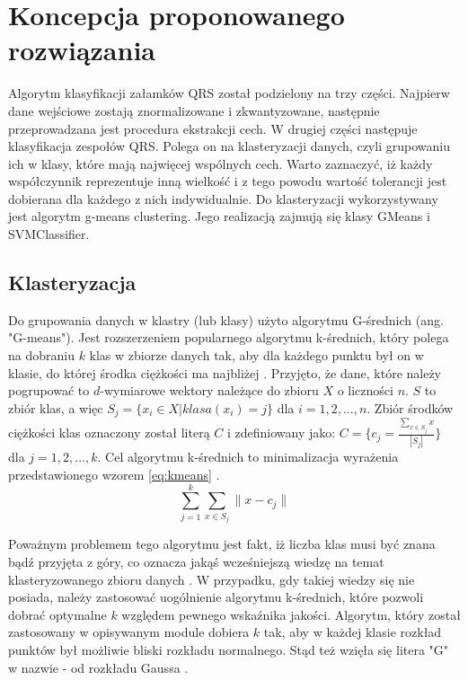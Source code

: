 \section{Koncepcja proponowanego rozwiązania}

\qquad Algorytm klasyfikacji załamków QRS został podzielony na trzy części. Najpierw dane wejściowe zostają znormalizowane i zkwantyzowane, następnie przeprowadzana jest procedura ekstrakcji cech. W drugiej części następuje klasyfikacja zespołów QRS. Polega on na  klasteryzacji danych, czyli grupowaniu ich w klasy, które mają najwięcej wspólnych cech. Warto zaznaczyć, iż każdy współczynnik reprezentuje inną wielkość i z tego powodu wartość tolerancji jest dobierana dla każdego z nich indywidualnie. Do klasteryzacji wykorzystywany jest algorytm g-means clustering. Jego realizacją zajmują się klasy GMeans i SVMClassifier.

\subsection{Klasteryzacja}

\qquad Do grupowania danych w klastry (lub klasy) użyto algorytmu G-średnich (ang. "G-means"). Jest rozszerzeniem popularnego algorytmu k-średnich, który polega na dobraniu $k$ klas w zbiorze danych tak, aby dla każdego punktu był on w klasie, do której środka ciężkości ma najbliżej \cite{KMeans}. Przyjęto, że dane, które należy pogrupować to $d$-wymiarowe wektory należące do zbioru $X$ o liczności $n$. $S$ to zbiór klas, a więc $S_{j} = \{x_{i} \in X | klasa(x_{i}) = j\}$ dla $i = 1, 2, ..., n$. Zbiór środków ciężkości klas oznaczony został literą $C$ i zdefiniowany jako: $C = \{c_{j} = \frac{\sum_{x \in S_{j}} x}{|S_{j}|}\}$ dla $j = 1, 2, ..., k$.
Cel algorytmu k-średnich to minimalizacja wyrażenia przedstawionego wzorem \ref{eq:kmeans} .
\begin{equation}
\label{eq:kmeans}
\sum_{j=1}^{k}\sum_{x \in S_{j}} \|x - c_{j}\|
\end{equation}

Poważnym problemem tego algorytmu jest fakt, iż liczba klas musi być znana bądź przyjęta z góry, co oznacza jakąś wcześniejszą wiedzę na temat klasteryzowanego zbioru danych \cite{GMeans, GMeansExplanation}. W przypadku, gdy takiej wiedzy się nie posiada, należy zastosować uogólnienie algorytmu k-średnich, które pozwoli dobrać optymalne $k$ względem pewnego wskaźnika jakości.
Algorytm, który został zastosowany w opisywanym module dobiera $k$ tak, aby w każdej klasie rozkład punktów był możliwie bliski rozkładu normalnego. Stąd też wzięła się litera "G" w nazwie - od rozkładu Gaussa \cite{GMeans}.

